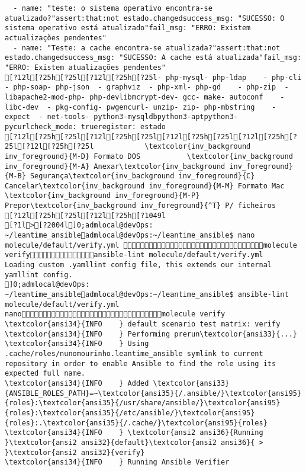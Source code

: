 \documentclass{scrartcl}
\begin{document}
\begin{Verbatim}
  - name: "teste: o sistema operativo encontra-se atualizado?"assert:that:not estado.changedsuccess_msg: "SUCESSO: O sistema operativo está atualizado"fail_msg: "ERRO: Existem actualizações pendentes"
  - name: "Teste: a cache encontra-se atualizada?"assert:that:not estado.changedsuccess_msg: "SUCESSO: A cache está atualizada"fail_msg: "ERRO: Existem atualizações pendentes"
[?12l[?25h[?25l[?12l[?25h[?25l- php-mysql- php-ldap    - php-cli  - php-soap- php-json  - graphviz  - php-xml- php-gd    - php-zip  - libapache2-mod-php- php-devlibmcrypt-dev- gcc- make- autoconf    - libc-dev  - pkg-config- pwgencurl- unzip- zip- php-mbstring    - expect  - net-tools- python3-mysqldbpython3-aptpython3-pycurlcheck_mode: trueregister: estado
[?12l[?25h[?25l[?12l[?25h[?25l[?12l[?25h[?25l[?12l[?25h[?25l[?12l[?25h[?25l            \textcolor{inv_background inv_foreground}{M-D} Formato DOS           \textcolor{inv_background inv_foreground}{M-A} Anexar\textcolor{inv_background inv_foreground}{M-B} Segurança\textcolor{inv_background inv_foreground}{C} Cancelar\textcolor{inv_background inv_foreground}{M-M} Formato Mac           \textcolor{inv_background inv_foreground}{M-P} Prepor\textcolor{inv_background inv_foreground}{^T} P/ ficheiros
[?12l[?25h[?25l[?12l[?25h[?1049l
[?1l>[?2004l]0;admlocal@devOps: ~/leantime_ansibleadmlocal@devOps:~/leantime_ansible$ nano molecule/default/verify.yml molecule verifyansible-lint molecule/default/verify.yml 
Loading custom .yamllint config file, this extends our internal yamllint config.
]0;admlocal@devOps: ~/leantime_ansibleadmlocal@devOps:~/leantime_ansible$ ansible-lint molecule/default/verify.yml 
nanomolecule verify
\textcolor{ansi34}{INFO    } default scenario test matrix: verify
\textcolor{ansi34}{INFO    } Performing prerun\textcolor{ansi33}{...}
\textcolor{ansi34}{INFO    } Using .cache/roles/nunomourinho.leantime_ansible symlink to current repository in order to enable Ansible to find the role using its expected full name.
\textcolor{ansi34}{INFO    } Added \textcolor{ansi33}{ANSIBLE_ROLES_PATH}=~\textcolor{ansi35}{/.ansible/}\textcolor{ansi95}{roles}:\textcolor{ansi35}{/usr/share/ansible/}\textcolor{ansi95}{roles}:\textcolor{ansi35}{/etc/ansible/}\textcolor{ansi95}{roles}:.\textcolor{ansi35}{/.cache/}\textcolor{ansi95}{roles}
\textcolor{ansi34}{INFO    } \textcolor{ansi2 ansi36}{Running }\textcolor{ansi2 ansi32}{default}\textcolor{ansi2 ansi36}{ > }\textcolor{ansi2 ansi32}{verify}
\textcolor{ansi34}{INFO    } Running Ansible Verifier


\end{Verbatim}
\end{document}
